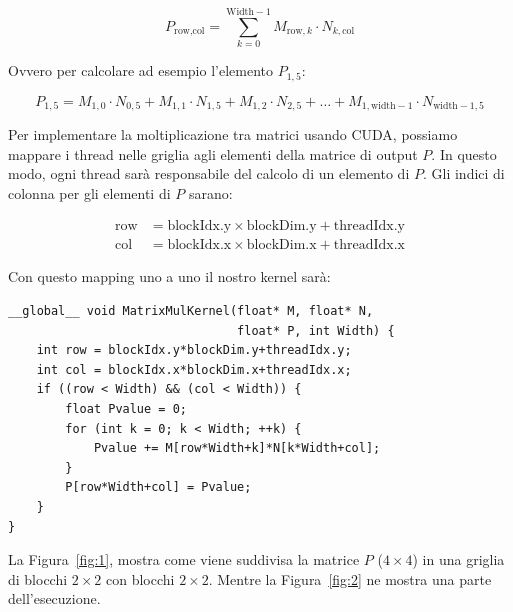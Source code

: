 \documentclass[a4paper]{article}
\begin{document}
\[
    P_{\text{row}, \text{col}} = \sum_{k=0}^{\text{Width}-1} M_{\text{row}, k} \cdot N_{k, \text{col}}
\]

Ovvero per calcolare ad esempio l'elemento $P_{1, 5}$:

\[
    P_{1,5} = M_{1,0} \cdot N_{0,5} + M_{1,1} \cdot N_{1,5} + M_{1,2} \cdot N_{2,5} + \ldots + M_{1,\text{width}-1} \cdot N_{\text{width}-1,5}
\]

Per implementare la moltiplicazione tra matrici usando CUDA, possiamo mappare i thread nelle griglia agli elementi della matrice di output $P$. In questo modo, ogni thread sarà responsabile del calcolo di un elemento di $P$. Gli indici di colonna per gli elementi di $P$ sarano:

\[
    \begin{aligned}
        \text{row} & = \text{blockIdx.y} \times \text{blockDim.y} + \text{threadIdx.y} \\
        \text{col} & = \text{blockIdx.x} \times \text{blockDim.x} + \text{threadIdx.x}
    \end{aligned}
\]

Con questo mapping uno a uno il nostro kernel sarà:

\begin{lstlisting}[caption={Kernel CUDA con memoria globale}, label={lst:1}]
__global__ void MatrixMulKernel(float* M, float* N,
                                float* P, int Width) {
    int row = blockIdx.y*blockDim.y+threadIdx.y;
    int col = blockIdx.x*blockDim.x+threadIdx.x;
    if ((row < Width) && (col < Width)) {
        float Pvalue = 0;
        for (int k = 0; k < Width; ++k) {
            Pvalue += M[row*Width+k]*N[k*Width+col];
        }
        P[row*Width+col] = Pvalue;
    }
}
\end{lstlisting}

\newpage

La Figura~\ref{fig:1}, mostra come viene suddivisa la matrice $P$ ($4\times{4}$) in una griglia di blocchi $2\times{2}$ con blocchi $2\times{2}$. Mentre la Figura~\ref{fig:2} ne mostra una parte dell'esecuzione.
\end{document}
